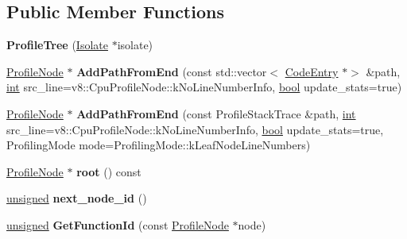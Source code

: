 \subsection*{Public Member Functions}
\begin{DoxyCompactItemize}
\item 
\mbox{\label{classv8_1_1internal_1_1ProfileTree_ad0a684dc116b33cae0283694e33af15f}} 
{\bfseries Profile\+Tree} (\mbox{\hyperlink{classv8_1_1internal_1_1Isolate}{Isolate}} $\ast$isolate)
\item 
\mbox{\label{classv8_1_1internal_1_1ProfileTree_a2f2066b32fa506574a093427056b3347}} 
\mbox{\hyperlink{classv8_1_1internal_1_1ProfileNode}{Profile\+Node}} $\ast$ {\bfseries Add\+Path\+From\+End} (const std\+::vector$<$ \mbox{\hyperlink{classv8_1_1internal_1_1CodeEntry}{Code\+Entry}} $\ast$$>$ \&path, \mbox{\hyperlink{classint}{int}} src\+\_\+line=v8\+::\+Cpu\+Profile\+Node\+::k\+No\+Line\+Number\+Info, \mbox{\hyperlink{classbool}{bool}} update\+\_\+stats=true)
\item 
\mbox{\label{classv8_1_1internal_1_1ProfileTree_aa5db53be59f3acb60ff1e6070f3b0932}} 
\mbox{\hyperlink{classv8_1_1internal_1_1ProfileNode}{Profile\+Node}} $\ast$ {\bfseries Add\+Path\+From\+End} (const Profile\+Stack\+Trace \&path, \mbox{\hyperlink{classint}{int}} src\+\_\+line=v8\+::\+Cpu\+Profile\+Node\+::k\+No\+Line\+Number\+Info, \mbox{\hyperlink{classbool}{bool}} update\+\_\+stats=true, Profiling\+Mode mode=Profiling\+Mode\+::k\+Leaf\+Node\+Line\+Numbers)
\item 
\mbox{\label{classv8_1_1internal_1_1ProfileTree_a03154bc74928f83002cb9148cc2fbfa8}} 
\mbox{\hyperlink{classv8_1_1internal_1_1ProfileNode}{Profile\+Node}} $\ast$ {\bfseries root} () const
\item 
\mbox{\label{classv8_1_1internal_1_1ProfileTree_a8f6da4826c203b27853dd938cc629afe}} 
\mbox{\hyperlink{classunsigned}{unsigned}} {\bfseries next\+\_\+node\+\_\+id} ()
\item 
\mbox{\label{classv8_1_1internal_1_1ProfileTree_a801fa3c6cdc6c8ade55b1e33284301a7}} 
\mbox{\hyperlink{classunsigned}{unsigned}} {\bfseries Get\+Function\+Id} (const \mbox{\hyperlink{classv8_1_1internal_1_1ProfileNode}{Profile\+Node}} $\ast$node)
$$
\end{DoxyCompactItemize}
